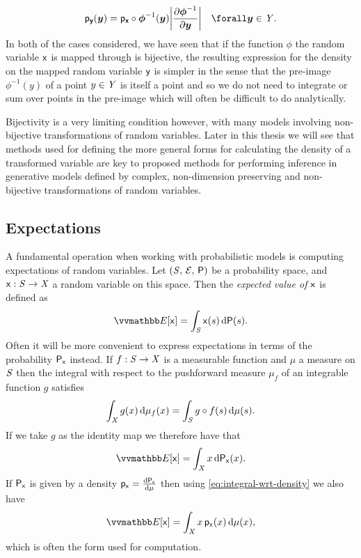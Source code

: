 \begin{equation}\label{eq:change-of-variables-vector-bijective}
  \pden{\rvct{y}}(\vct{y}) = 
    \pden{\rvct{x}}\circ\vct{\phi}^{-1}(\vct{y})
    \left|\pd{\vct{\phi}^{-1}}{\vct{y}}\right|
  \quad \forall \vct{y} \in \set{Y}.
\end{equation}
In both of the cases considered, we have seen that if the function $\phi$ the random variable $\mathsf{x}$ is mapped through is bijective, the resulting expression for the density on the mapped random variable $\mathsf{y}$ is simpler in the sense that the pre-image $\phi^{-1}(y)$ of a point $y \in \mathit{Y}$ is itself a point and so we do not need to integrate or sum over points in the pre-image which will often be difficult to do analytically. 

Bijectivity is a very limiting condition however, with many models involving non-bijective transformations of random variables. Later in this thesis we will see that methods used for defining the more general forms for calculating the density of a transformed variable are key to proposed methods for performing inference in generative models defined by complex, non-dimension preserving and non-bijective transformations of random variables.

\subsection{Expectations}\label{subsec:expectations}

A fundamental operation when working with probabilistic models is computing expectations of random variables. Let $(\mathit{S},\,\mathcal{E},\,\mathsf{P})$ be a probability space, and $\mathsf{x} : \mathit{S} \to \mathit{X}$ a random variable on this space. Then the \emph{expected value of $\mathsf{x}$} is defined as
\begin{equation}\label{eq:expectation-general}
  \expc{\rvar{x}} = \int_{\set{S}} \rvar{x}(s) \,\dr\probability(s).
\end{equation}
Often it will be more convenient to express expectations in terms of the probability $\mathsf{P}_{\mathsf{x}}$ instead. If $f : \mathit{S} \to \mathit{X}$ is a measurable function and $\mu$ a measure on $\mathit{S}$ then the integral with respect to the pushforward measure $\mu_f$ of an integrable function $g$ satisfies
\begin{equation}\label{eq:integral-wrt-pushforward-measure}
  \int_{\mathit{X}} g(x) \,\mathrm{d}\mu_{f}(x) =
  \int_{\mathit{S}} g \circ f(s) \,\mathrm{d}\mu(s).
\end{equation}
If we take $g$ as the identity map we therefore have that
\begin{equation}\label{eq:expectation-pushfoward}
  \expc{\rvar{x}} = \int_{\set{X}} x \,\dr\prob{\rvar{x}}(x).
\end{equation}
If $\mathsf{P}_{\mathsf{x}}$ is given by a density $\mathsf{p}_{\mathsf{x}} = \frac{\mathrm{d} \mathsf{P}_{\mathsf{x}}}{\mathrm{d} \mu}$ then using \eqref{eq:integral-wrt-density} we also have
\begin{equation}\label{eq:expectation-density}
  \expc{\rvar{x}} = \int_{\set{X}} x \,\pden{\rvar{x}}(x) \,\dr\mu(x),
\end{equation}
which is often the form used for computation.

